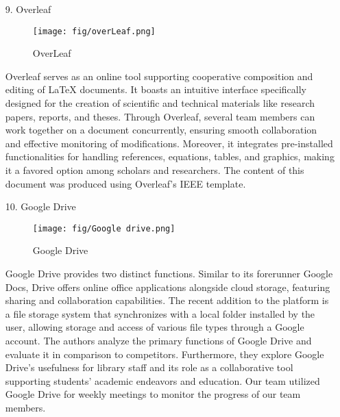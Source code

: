 \documentclass[conference]{IEEEtran}
\begin{document}
\begin{enumerate}
    \item[9.]Overleaf \\
    \begin{figure}[h]
    \centering
    \texttt{[image: fig/overLeaf.png]}
    \label{fig:OverLeaf}
    \caption{OverLeaf} 
    \end{figure}
    \item[]Overleaf serves as an online tool supporting cooperative composition and editing of LaTeX documents. It boasts an intuitive interface specifically designed for the creation of scientific and technical materials like research papers, reports, and theses. Through Overleaf, several team members can work together on a document concurrently, ensuring smooth collaboration and effective monitoring of modifications. Moreover, it integrates pre-installed functionalities for handling references, equations, tables, and graphics, making it a favored option among scholars and researchers. The content of this document was produced using Overleaf's IEEE template.\\

    \item[10.]Google Drive \cite{gallaway2013google}
    \begin{figure}[h]
    \centering
    \texttt{[image: fig/Google drive.png]}
    \label{fig:Google Drive}
    \caption{Google Drive} 
    \end{figure}
    \item[]Google Drive provides two distinct functions. Similar to its forerunner Google Docs, Drive offers online office applications alongside cloud storage, featuring sharing and collaboration capabilities. The recent addition to the platform is a file storage system that synchronizes with a local folder installed by the user, allowing storage and access of various file types through a Google account. The authors analyze the primary functions of Google Drive and evaluate it in comparison to competitors. Furthermore, they explore Google Drive's usefulness for library staff and its role as a collaborative tool supporting students' academic endeavors and education. Our team utilized Google Drive for weekly meetings to monitor the progress of our team members.\\ \\ \\ \\ \\ \\ \\ \\


\end{enumerate}
\end{document}
